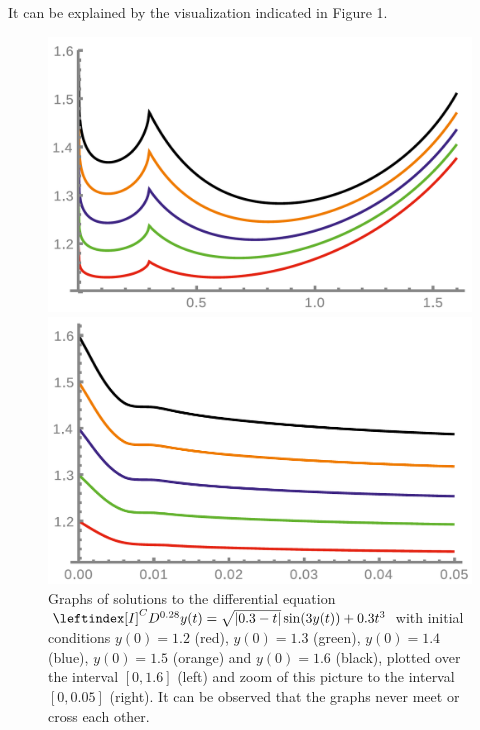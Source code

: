 It can be explained by the visualization indicated in Figure 1.
\begin{figure}[h]
    \begin{minipage}[l]{.5\textwidth}
      \includegraphics[scale = .25]{plot/3.png}
    \end{minipage}  
    \begin{minipage}[r]{.5\textwidth}
      \includegraphics[scale = .25]{plot/4.png}
    \end{minipage} 
    \caption{
        Graphs of solutions to the differential equation $\leftindex[I]^C {D^{0.28}}y(t) = \sqrt{|0.3-t|} \sin(3y(t))+ 0.3t^3$
        with initial conditions $y(0) = 1.2$ (red), $y(0) = 1.3$ (green), $y(0) = 1.4$ (blue), $y(0) = 1.5$ (orange)
        and $y(0) = 1.6$ (black), plotted over the interval $[0, 1.6]$ (left) and zoom of this picture to the interval
        $[0, 0.05]$ (right). It can be observed that the graphs never meet or cross each other.
    } 
\end{figure}
